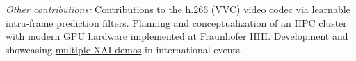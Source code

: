 {{{{                \vstep

                \emph{Other contributions:}
                Contributions to the h.266 (VVC) video codec via learnable intra-frame prediction filters.
                Planning and conceptualization of an HPC cluster with modern GPU hardware implemented at Fraunhofer HHI.
                Development and showcasing
                \href{https://lrpserver.hhi.fraunhofer.de/}{multiple XAI demos}
                in international events.

                \vstep
                }
            \fi


        }
    }
}


